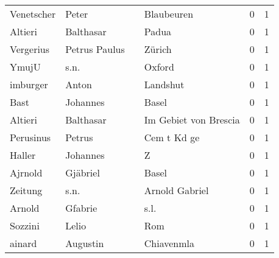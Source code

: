 \documentclass[10pt,a4paper,landscape]{article}
\begin{document}
\begin{longtable}{llllrr}
               Venetscher &                              Peter &             &                                  Blaubeuren &          0 &         1 \\
                  Altieri &                          Balthasar &             &                                       Padua &          0 &         1 \\
                Vergerius &                      Petrus Paulus &             &                                      Zürich &          0 &         1 \\
                    YmujU &                               s.n. &             &                                      Oxford &          0 &         1 \\
                 imburger &                              Anton &             &                                    Landshut &          0 &         1 \\
                     Bast &                           Johannes &             &                                       Basel &          0 &         1 \\
                  Altieri &                          Balthasar &             &                       Im Gebiet von Brescia &          0 &         1 \\
                Perusinus &                             Petrus &             &                                 Cem t Kd ge &          0 &         1 \\
                   Haller &                           Johannes &             &                                           Z &          0 &         1 \\
                  Ajrnold &                           Gjäbriel &             &                                       Basel &          0 &         1 \\
                  Zeitung &                               s.n. &             &                              Arnold Gabriel &          0 &         1 \\
                   Arnold &                            Gfabrie &             &                                        s.l. &          0 &         1 \\
                  Sozzini &                              Lelio &             &                                         Rom &          0 &         1 \\
                   ainard &                           Augustin &             &                                  Chiavenmla &          0 &         1 \\

\end{longtable}
\end{document}
